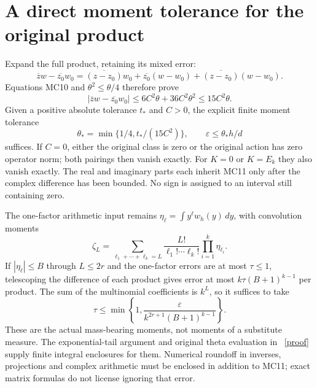 \documentclass[11pt]{article}
\begin{document}
\section{A direct moment tolerance for the original product}
Expand the full product, retaining its mixed error:
\[
 \overline z w-\overline{z_0}w_0
 =\overline{(z-z_0)}w_0+\overline{z_0}(w-w_0)
   +\overline{(z-z_0)}(w-w_0).
\]
Equations MC10 and $\theta^2\le\theta/4$ therefore prove
\[
 \boxed{\left|\overline z w-\overline{z_0}w_0\right|
 \le 6C^2\theta+36C^2\theta^2\le15C^2\theta.}               \tag{MC11}
\]
Given a positive absolute tolerance $t_*$ and $C>0$, the explicit
finite moment tolerance
\[
 \boxed{\theta_* =\min\{1/4,t_*/(15C^2)\},\qquad
             \varepsilon\le\theta_*h/d}                    \tag{MC12}
\]
suffices. If $C=0$, either the original class is zero or the original
action has zero operator norm; both pairings then vanish exactly.
For $K=0$ or $K=E_k$ they also vanish exactly. The real and imaginary
parts each inherit MC11 only after the complex difference has been
bounded. No sign is assigned to an interval still containing zero.

The one-factor arithmetic input remains
$\eta_\ell=\int y^\ell w_h(y)\,dy$, with convolution moments
\[
 \zeta_L=\sum_{\ell_1+\cdots+\ell_k=L}
 \frac{L!}{\ell_1!\cdots\ell_k!}\prod_{i=1}^k\eta_{\ell_i}.
\]
If $|\eta_\ell|\le B$ through $L\le2r$ and the one-factor errors
are at most $\tau\le1$, telescoping the difference of each product
gives error at most $k\tau(B+1)^{k-1}$ per product. The sum of the
multinomial coefficients is $k^L$, so it suffices to take
\[
 \tau\le\min\left\{1,
 \frac{\varepsilon}{k^{2r+1}(B+1)^{k-1}}\right\}.             \tag{MC13}
\]
These are the actual mass-bearing moments, not moments of a substitute
measure. The exponential-tail argument and original theta evaluation
in \cite{precision}%
~\href{https://github.com/KokunoYumeto/zeta-function-research-reader/blob/5992ad50c0f2a06921f1fcaded7b4e38097c0739/workbenches/splitzero-tandem/continuations/20260920-original-kernel-mixed-determinants/providers/NATIVE_MOMENT_PRECISION.tex\#L1}{[proof]}%
{} supply finite integral enclosures for them.
Numerical roundoff in inverses, projections and complex arithmetic
must be enclosed in addition to MC11; exact matrix formulas do not
license ignoring that error.
\end{document}
